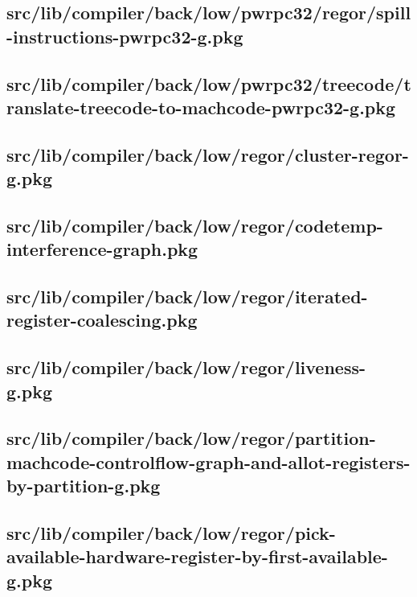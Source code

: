 \subsection{src/lib/compiler/back/low/pwrpc32/regor/spill-instructions-pwrpc32-g.pkg}


\subsection{src/lib/compiler/back/low/pwrpc32/treecode/translate-treecode-to-machcode-pwrpc32-g.pkg}


\subsection{src/lib/compiler/back/low/regor/cluster-regor-g.pkg}


\subsection{src/lib/compiler/back/low/regor/codetemp-interference-graph.pkg}


\subsection{src/lib/compiler/back/low/regor/iterated-register-coalescing.pkg}


\subsection{src/lib/compiler/back/low/regor/liveness-g.pkg}


\subsection{src/lib/compiler/back/low/regor/partition-machcode-controlflow-graph-and-allot-registers-by-partition-g.pkg}


\subsection{src/lib/compiler/back/low/regor/pick-available-hardware-register-by-first-available-g.pkg}


